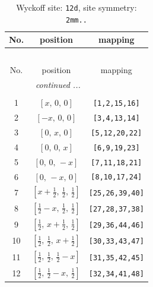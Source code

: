 \documentclass[fleqn,8pt]{jsarticle}
\begin{document}
\begin{longtable}{ccc}
\caption{Wyckoff site: {\tt 12d}, site symmetry: {\tt 2mm..}}
 \\
 \hline \hline
No. & position & mapping \\ \hline \endfirsthead

\multicolumn{2}{l}{\tablename\ \thetable{}} \\
 \hline \hline
No. & position & mapping \\ \hline \endhead

 \hline \hline
\multicolumn{2}{r}{\footnotesize\it continued ...} \\ \endfoot

 \hline \hline
\multicolumn{2}{r}{} \\ \endlastfoot

1 & $\left[ x,\, 0,\, 0 \right]$ & {\tt [1,2,15,16]} \\ \hline
2 & $\left[ - x,\, 0,\, 0 \right]$ & {\tt [3,4,13,14]} \\ \hline
3 & $\left[ 0,\, x,\, 0 \right]$ & {\tt [5,12,20,22]} \\ \hline
4 & $\left[ 0,\, 0,\, x \right]$ & {\tt [6,9,19,23]} \\ \hline
5 & $\left[ 0,\, 0,\, - x \right]$ & {\tt [7,11,18,21]} \\ \hline
6 & $\left[ 0,\, - x,\, 0 \right]$ & {\tt [8,10,17,24]} \\ \hline
7 & $\left[ x + \frac{1}{2},\, \frac{1}{2},\, \frac{1}{2} \right]$ & {\tt [25,26,39,40]} \\ \hline
8 & $\left[ \frac{1}{2} - x,\, \frac{1}{2},\, \frac{1}{2} \right]$ & {\tt [27,28,37,38]} \\ \hline
9 & $\left[ \frac{1}{2},\, x + \frac{1}{2},\, \frac{1}{2} \right]$ & {\tt [29,36,44,46]} \\ \hline
10 & $\left[ \frac{1}{2},\, \frac{1}{2},\, x + \frac{1}{2} \right]$ & {\tt [30,33,43,47]} \\ \hline
11 & $\left[ \frac{1}{2},\, \frac{1}{2},\, \frac{1}{2} - x \right]$ & {\tt [31,35,42,45]} \\ \hline
12 & $\left[ \frac{1}{2},\, \frac{1}{2} - x,\, \frac{1}{2} \right]$ & {\tt [32,34,41,48]} \\
\end{longtable}
\renewcommand{\arraystretch}{1.2}
\end{document}
